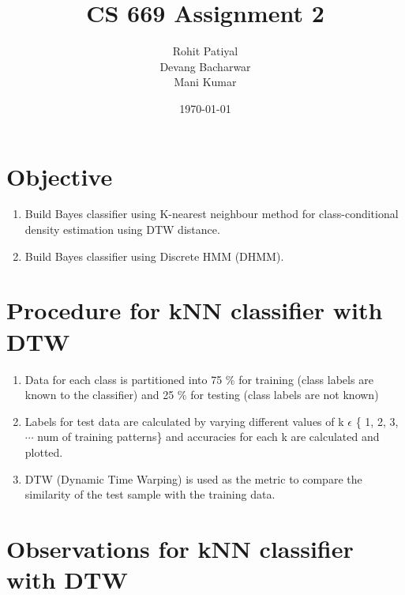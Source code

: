 \documentclass[a4paper]{article}
\title{CS 669 Assignment 2}
\author{Rohit Patiyal \\ Devang Bacharwar \\ Mani Kumar}
\date{\today}
\begin{document}
\maketitle

\vspace{2.0cm}

\tableofcontents

\clearpage

\section {Objective}
	
	\begin{enumerate}
		\item{
Build Bayes classifier using K-nearest neighbour method for class-conditional density estimation using DTW distance. }
			
		\item{Build Bayes classifier using Discrete HMM (DHMM).}
	\end{enumerate}
	
		
\vspace{1.0cm}

\section{Procedure for kNN classifier with DTW}
	\begin{enumerate}
	  \item {Data for each class is partitioned into 75 \% for training (class labels are known to the classifier) and 25
	  \% for testing (class labels are not known)}
	 
     \item {Labels for test data are calculated by varying different values of k $\epsilon$ \{ 1, 2, 3, $\cdots$ num of training patterns\} and accuracies for each k are calculated and plotted.}
     \item {
      DTW (Dynamic Time Warping) is used as the metric to compare the similarity of the test sample with the training data.     
     }
	 
	\end{enumerate}

\vspace{1.0cm}



\section{Observations  for kNN classifier with DTW}
	 
\end{document}

